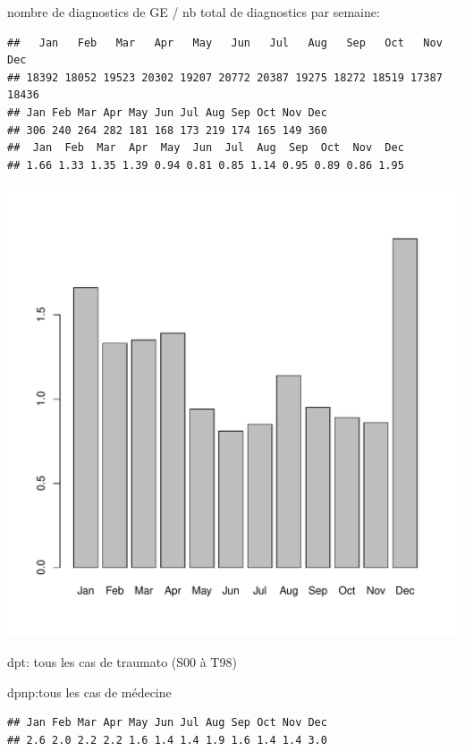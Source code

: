\documentclass[12pt,english,french,twoside]{book}\usepackage[]{graphicx}\usepackage[]{color}
\makeatletter
\def\maxwidth{ %
  \ifdim\Gin@nat@width>\linewidth
    \linewidth
  \else
    \Gin@nat@width
  \fi
}
\newenvironment{kframe}{%
 \def\at@end@of@kframe{}%
 \ifinner\ifhmode%
  \def\at@end@of@kframe{\end{minipage}}%
  \begin{minipage}{\columnwidth}%
 \fi\fi%
 \def\FrameCommand##1{\hskip\@totalleftmargin \hskip-\fboxsep
 \colorbox{shadecolor}{##1}\hskip-\fboxsep
     \hskip-\linewidth \hskip-\@totalleftmargin \hskip\columnwidth}%
 \MakeFramed {\advance\hsize-\width
   \@totalleftmargin\z@ \linewidth\hsize
   \@setminipage}}%
 {\par\unskip\endMakeFramed%
 \at@end@of@kframe}
\newenvironment{knitrout}{}{} %
\makeatother
\begin{document}
nombre de diagnostics de GE / nb total de diagnostics par semaine:
\begin{knitrout}
\color{fgcolor}\begin{kframe}
\begin{verbatim}
##   Jan   Feb   Mar   Apr   May   Jun   Jul   Aug   Sep   Oct   Nov   Dec 
## 18392 18052 19523 20302 19207 20772 20387 19275 18272 18519 17387 18436
## Jan Feb Mar Apr May Jun Jul Aug Sep Oct Nov Dec 
## 306 240 264 282 181 168 173 219 174 165 149 360
##  Jan  Feb  Mar  Apr  May  Jun  Jul  Aug  Sep  Oct  Nov  Dec 
## 1.66 1.33 1.35 1.39 0.94 0.81 0.85 1.14 0.95 0.89 0.86 1.95
\end{verbatim}
\end{kframe}
\includegraphics[width=\maxwidth]{figure/invs} 

\end{knitrout}



dpt: tous les cas de traumato (S00 à T98)

dpnp:tous les cas de médecine  

\begin{knitrout}
\color{fgcolor}\begin{kframe}
\begin{verbatim}
## Jan Feb Mar Apr May Jun Jul Aug Sep Oct Nov Dec 
## 2.6 2.0 2.2 2.2 1.6 1.4 1.4 1.9 1.6 1.4 1.4 3.0
\end{verbatim}
\end{kframe}
\end{knitrout}
\end{document}
